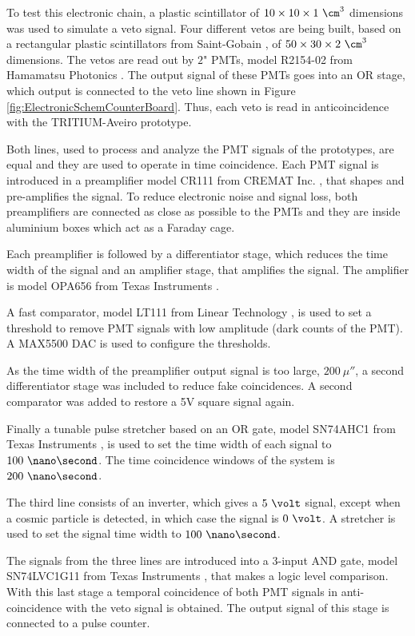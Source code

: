 \begin{enumerate}
To test this electronic chain, a plastic scintillator of $10 \times 10 \times 1~\cm^3$ dimensions was used to simulate a veto signal. Four different vetos are being built, based on a rectangular plastic scintillators from Saint-Gobain \cite{VetoAveiro}, of $50\times 30 \times 2~\cm^3$ dimensions. The vetos are read out by $2$" PMTs, model R2154-02 from Hamamatsu Photonics \cite{DataSheetPMTsAveiro}. The output signal of these PMTs goes into an OR stage, which output is connected to the veto line shown in Figure \ref{fig:ElectronicSchemCounterBoard}. Thus, each veto is read in anticoincidence with the TRITIUM-Aveiro prototype.

Both lines, used to process and analyze the PMT signals of the prototypes, are equal and they are used to operate in time coincidence. Each PMT signal is introduced in a preamplifier model CR111 from CREMAT Inc. \cite{CREMATPreAmplifierDataSheet}, that shapes and pre-amplifies the signal. To reduce electronic noise and signal loss, both preamplifiers are connected as close as possible to the PMTs and they are inside aluminium boxes which act as a Faraday cage.

Each preamplifier is followed by a differentiator stage, which reduces the time width of the signal and an amplifier stage, that amplifies the signal. The amplifier is model OPA656 from Texas Instruments \cite{OPA656}. 

A fast comparator, model LT111 from Linear Technology \cite{LT111}, is used to set a threshold to remove PMT signals with low amplitude (dark counts of the PMT). A MAX5500 DAC is used to configure the thresholds.

As the time width of the preamplifier output signal is too large, $200~\mu\second$, a second differentiator stage was included to reduce fake coincidences. A second comparator was added to restore a 5V square signal again.

Finally a tunable pulse stretcher based on an OR gate, model SN74AHC1 from Texas Instruments \cite{Stretcher}, is used to set the time width of each signal to $100~\nano\second$. The time coincidence windows of the system is $200~\nano\second$.

The third line consists of an inverter, which gives a $5~\volt$ signal, except when a cosmic particle is detected, in which case the signal is $0~\volt$. A stretcher is used to set the signal time width to $100~\nano\second$.

The signals from the three lines are introduced into a 3-input AND gate, model SN74LVC1G11 from Texas Instruments \cite{ANDGate}, that makes a logic level comparison. With this last stage a temporal coincidence of both PMT signals in anti-coincidence with the veto signal is obtained. The output signal of this stage is connected to a pulse counter. 


\end{enumerate}
